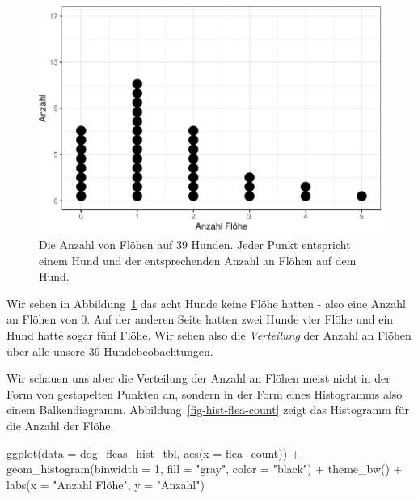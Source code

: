 \documentclass[
  letterpaper,
]{scrbook}
\newenvironment{Shaded}{\begin{snugshade}}{\end{snugshade}}
\newcommand{\AttributeTok}[1]{\textcolor[rgb]{0.40,0.45,0.13}{#1}}
\newcommand{\DecValTok}[1]{\textcolor[rgb]{0.68,0.00,0.00}{#1}}
\newcommand{\FunctionTok}[1]{\textcolor[rgb]{0.28,0.35,0.67}{#1}}
\newcommand{\NormalTok}[1]{\textcolor[rgb]{0.00,0.23,0.31}{#1}}
\newcommand{\SpecialCharTok}[1]{\textcolor[rgb]{0.37,0.37,0.37}{#1}}
\newcommand{\StringTok}[1]{\textcolor[rgb]{0.13,0.47,0.30}{#1}}
\begin{document}
\begin{figure}

{\centering \includegraphics{./eda-ggplot_files/figure-pdf/fig-dotplot-flea-1-1.pdf}

}

\caption{\label{fig-dotplot-flea-1}Die Anzahl von Flöhen auf 39 Hunden.
Jeder Punkt entspricht einem Hund und der entsprechenden Anzahl an
Flöhen auf dem Hund.}

\end{figure}

Wir sehen in Abbildung~\ref{fig-dotplot-flea-1} das acht Hunde keine
Flöhe hatten - also eine Anzahl an Flöhen von 0. Auf der anderen Seite
hatten zwei Hunde vier Flöhe und ein Hund hatte sogar fünf Flöhe. Wir
sehen also die \emph{Verteilung} der Anzahl an Flöhen über alle unsere
39 Hundebeobachtungen.

Wir schauen uns aber die Verteilung der Anzahl an Flöhen meist nicht in
der Form von gestapelten Punkten an, sondern in der Form eines
Histogramms also einem Balkendiagramm.
Abbildung~\ref{fig-hist-flea-count} zeigt das Histogramm für die Anzahl
der Flöhe.

\begin{Shaded}
\begin{Highlighting}[]
\FunctionTok{ggplot}\NormalTok{(}\AttributeTok{data =}\NormalTok{ dog\_fleas\_hist\_tbl, }\FunctionTok{aes}\NormalTok{(}\AttributeTok{x =}\NormalTok{ flea\_count)) }\SpecialCharTok{+}
  \FunctionTok{geom\_histogram}\NormalTok{(}\AttributeTok{binwidth =} \DecValTok{1}\NormalTok{, }\AttributeTok{fill =} \StringTok{"gray"}\NormalTok{, }\AttributeTok{color =} \StringTok{"black"}\NormalTok{) }\SpecialCharTok{+}
  \FunctionTok{theme\_bw}\NormalTok{() }\SpecialCharTok{+}
  \FunctionTok{labs}\NormalTok{(}\AttributeTok{x =} \StringTok{"Anzahl Flöhe"}\NormalTok{, }\AttributeTok{y =} \StringTok{"Anzahl"}\NormalTok{) }
\end{Highlighting}
\end{Shaded}
\end{document}
